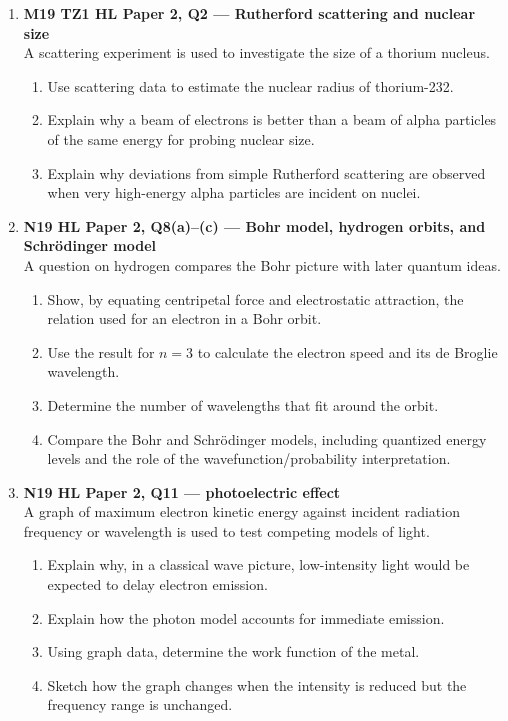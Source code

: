 \documentclass[11pt]{article}
\begin{document}
\begin{enumerate}[leftmargin=*, itemsep=1.2em]
\item \textbf{M19 TZ1 HL Paper 2, Q2 --- Rutherford scattering and nuclear size}\\
A scattering experiment is used to investigate the size of a thorium nucleus.
\begin{enumerate}[label=(\alph*)]
\item Use scattering data to estimate the nuclear radius of thorium-232.
\item Explain why a beam of electrons is better than a beam of alpha particles of the same energy for probing nuclear size.
\item Explain why deviations from simple Rutherford scattering are observed when very high-energy alpha particles are incident on nuclei.
\end{enumerate}

\item \textbf{N19 HL Paper 2, Q8(a)--(c) --- Bohr model, hydrogen orbits, and Schr\"odinger model}\\
A question on hydrogen compares the Bohr picture with later quantum ideas.
\begin{enumerate}[label=(\alph*)]
\item Show, by equating centripetal force and electrostatic attraction, the relation used for an electron in a Bohr orbit.
\item Use the result for $n=3$ to calculate the electron speed and its de Broglie wavelength.
\item Determine the number of wavelengths that fit around the orbit.
\item Compare the Bohr and Schr\"odinger models, including quantized energy levels and the role of the wavefunction/probability interpretation.
\end{enumerate}

\item \textbf{N19 HL Paper 2, Q11 --- photoelectric effect}\\
A graph of maximum electron kinetic energy against incident radiation frequency or wavelength is used to test competing models of light.
\begin{enumerate}[label=(\alph*)]
\item Explain why, in a classical wave picture, low-intensity light would be expected to delay electron emission.
\item Explain how the photon model accounts for immediate emission.
\item Using graph data, determine the work function of the metal.
\item Sketch how the graph changes when the intensity is reduced but the frequency range is unchanged.
\end{enumerate}


\end{enumerate}
\end{document}
